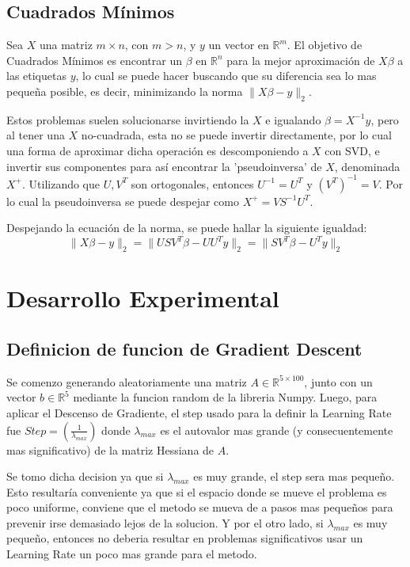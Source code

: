 \documentclass{article}
\begin{document}
\subsection*{Cuadrados Mínimos}
Sea \( X \) una matriz \( m \times n \), con \( m > n \), y \( y \) un vector en \( \mathbb{R}^m \). El objetivo de Cuadrados Mínimos es encontrar un $\beta$ en \( \mathbb{R}^n \) para la mejor aproximación de $X\beta$ a las etiquetas $y$, lo cual se puede hacer buscando que su diferencia sea lo mas pequeña posible, es decir, minimizando la norma \( \|X\beta - y\|_2 \). \vspace{0.05cm}

\noindent Estos problemas suelen solucionarse invirtiendo la $X$ e igualando $\beta = X^{-1}y$, pero al tener una $X$ no-cuadrada, esta no se puede invertir directamente, por lo cual una forma de aproximar dicha operación es descomponiendo a $X$ con SVD, e invertir sus componentes para así encontrar la 'pseudoinversa' de $X$, denominada $X^+$. Utilizando que $U, V^T$ son ortogonales, entonces $U^{-1} = U^T$ y $(V^T)^{-1} = V$. Por lo cual la pseudoinversa se puede despejar como \( X^+ = VS^{-1}U^T \). \vspace{0.35\baselineskip}

\noindent Despejando la ecuación de la norma, se puede hallar la siguiente igualdad:
\[
\|X\beta - y\|_2 = \|USV^T \beta - U U^T y\|_2 = \|S V^T \beta - U^T y\|_2
\]

\section*{Desarrollo Experimental}

\subsection*{Definicion de funcion de Gradient Descent}

\noindent Se comenzo generando aleatoriamente una matriz $A \in \mathbb{R}^{5 \times 100}$, junto con un vector $b \in \mathbb{R}^5$ mediante la funcion random de la libreria Numpy. Luego, para aplicar el Descenso de Gradiente, el step usado para la definir la Learning Rate fue 
$Step = \left(\frac{1}{\lambda_{max}}\right)$ donde $\lambda_{max}$ es el autovalor mas grande (y consecuentemente mas significativo) de la matriz Hessiana de $A$. \vspace{\baselineskip}

\noindent Se tomo dicha decision ya que si $\lambda_{max}$ es muy grande, el step sera mas pequeño. Esto resultaría conveniente ya que si el espacio donde se mueve el problema es poco uniforme, conviene que el metodo se mueva de a pasos mas pequeños para prevenir irse demasiado lejos de la solucion. Y por el otro lado, si $\lambda_{max}$ es muy pequeño, entonces no deberia resultar en problemas significativos usar un Learning Rate un poco mas grande para el metodo. \vspace{\baselineskip}
\end{document}
